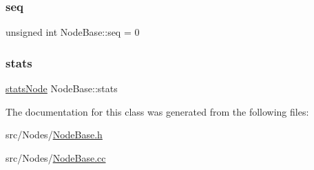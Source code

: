 \mbox{\label{classNodeBase_a4fe5b1b7aeb49d15ec7986133346aeb7}} 
\subsubsection{\texorpdfstring{seq}{seq}}
{\footnotesize\ttfamily unsigned int Node\+Base\+::seq = 0\hspace{0.3cm}{\ttfamily [protected]}}

\mbox{\label{classNodeBase_a12b20bca634637499bf55020c398424e}} 
\subsubsection{\texorpdfstring{stats}{stats}}
{\footnotesize\ttfamily \hyperlink{NodeBase_8h_a6d83bdf09c8e309d31f9330091b0d10d}{stats\+Node} Node\+Base\+::stats\hspace{0.3cm}{\ttfamily [protected]}}



The documentation for this class was generated from the following files\+:\begin{DoxyCompactItemize}
\item 
src/\+Nodes/\hyperlink{NodeBase_8h}{Node\+Base.\+h}\item 
src/\+Nodes/\hyperlink{NodeBase_8cc}{Node\+Base.\+cc}\end{DoxyCompactItemize}
